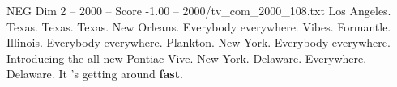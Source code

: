\begin{textsample}{NEG Dim 2 – 2000 – Score -1.00 – 2000/tv\_com\_2000\_108.txt}  \label{ex:f2_neg_010}
Los Angeles.
Texas.
Texas.
Texas.
New Orleans.
Everybody everywhere.
Vibes.
Formantle.
Illinois.
Everybody everywhere.
Plankton.
New York.
Everybody everywhere.
Introducing the all-new Pontiac Vive.
New York.
Delaware.
Everywhere.
Delaware.
It 's getting around \textbf{fast}.

\end{textsample}
